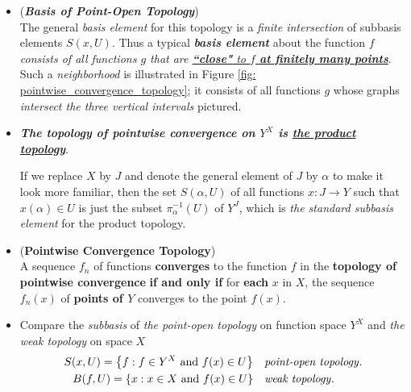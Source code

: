\documentclass[11pt]{article}
\begin{document}
\begin{itemize}
\item \begin{remark} (\emph{\textbf{Basis of Point-Open Topology}})\\
The general \emph{basis element} for this topology is a \emph{finite intersection} of subbasis elements $S(x, U)$. Thus a typical \emph{\textbf{basis element}} about the function $f$ \emph{consists of all functions $g$ that are \underline{\textbf{``close"} to $f$ \textbf{at finitely many points}}}. Such a \emph{neighborhood} is illustrated in Figure \ref{fig: pointwise_convergence_topology}; it consists of all functions $g$ whose graphs \emph{intersect the three vertical intervals} pictured.
\end{remark}

\item \begin{remark}
\emph{\textbf{The topology of pointwise convergence on $Y^X$ is \underline{the product topology}}}. 

If we replace $X$ by $J$ and denote the general element of $J$ by $\alpha$ to make it look more familiar, then the set $S(\alpha, U)$ of all functions $x : J \rightarrow Y$
such that $x(\alpha) \in U$ is just the subset $\pi_{\alpha}^{-1}(U)$ of $Y^J$, which is \emph{the standard subbasis element} for the product topology.
\end{remark}

\item \begin{proposition} (\textbf{Pointwise Convergence Topology})\citep{munkres2000topology}\\
A sequence $f_n$ of functions \textbf{converges} to the function $f$ in the \textbf{topology of pointwise convergence} \textbf{if and only if} for \textbf{each} $x$ in $X$, the sequence $f_n(x)$ of \textbf{points of $Y$} converges to the point $f(x)$.
\end{proposition}


\item \begin{remark}
Compare the \emph{subbasis} of \emph{the point-open topology} on function space $Y^X$ and \emph{the weak topology} on space $X$
\begin{align*}
S(x, U) = \left\{f:  f \in Y^X\text{ and }f(x) \in U\right\} &\quad \text{\emph{point-open topology}}.\\
B(f, U) = \left\{x:  x \in X\text{ and }f(x) \in U\right\} &\quad \text{\emph{weak topology}}.
\end{align*}
\end{remark}


\end{itemize}
\end{document}
